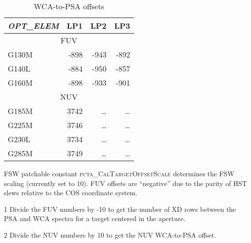 \begin{table}[htb!]
\centering
\vspace{-0.1cm}
\footnotesize
	\begin{threeparttable}[tbc]
	\caption[]{ WCA-to-PSA offsets}
	\begin{tabular*}{.75\linewidth}{@{\extracolsep{\fill}}lrrr}
		\toprule
		\textit{OPT\_ELEM} &	LP1	&	LP2	&	LP3	\\
		\toprule
		\multicolumn{4}{c}{FUV\tnote{1}}\\
		\midrule
		G130M	&	 -898	&	-943	&	-892 \\
		G140L	&	 -884	&	-950	&	-857 \\
		G160M	&	 -898	&	-933	&	-901 \\
		\midrule
		\multicolumn{4}{c}{NUV\tnote{2}}\\
		\midrule
		G185M	&	3742	&	\dots	&	\dots \\
		G225M	&	3746	&	\dots	&	\dots \\
		G230L	&	3734	&	\dots	&	\dots \\
		G285M	&	3749	&	\dots	&	\dots \\
		\bottomrule
	\end{tabular*}
	\scriptsize
		\begin{tablenotes}
			\item[] {FSW patchable constant \textsc{pcta\_CalTargetOffsetScale} determines the FSW scaling (currently set to 10). FUV offsets are ``negative'' due to the parity of HST slews relative to the COS coordinate system.\\}
			\item[1] {Divide the FUV numbers by -10 to get the number of XD rows between the PSA and WCA spectra for a target centered in the aperture.}
			\item[2] {Divide the NUV numbers by 10 to get the NUV WCA-to-PSA offset. }
		\end{tablenotes}
	\label{tab:wcatopsa}
	\normalsize
	\end{threeparttable}
\end{table}

